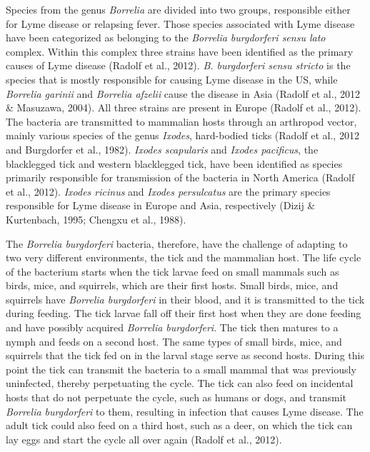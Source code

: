 \documentclass[12pt,twoside]{reedthesis}
\begin{document}
	
	 Species from the genus \textit{Borrelia} are divided into two groups, responsible either for Lyme disease or relapsing fever. Those species associated with Lyme disease have been categorized as belonging to the \textit{Borrelia burgdorferi sensu lato} complex. Within this complex three strains have been identified as the primary causes of Lyme disease (Radolf et al., 2012). \textit{B. burgdorferi sensu stricto} is the species that is mostly responsible for causing Lyme disease in the US, while \textit{Borrelia garinii} and \textit{Borrelia afzelii} cause the disease in Asia (Radolf et al., 2012 \& Masuzawa, 2004). All three strains are present in Europe (Radolf et al., 2012). The bacteria are transmitted to mammalian hosts through an arthropod vector, mainly various species of the genus \textit{Ixodes}, hard-bodied ticks (Radolf et al., 2012 and Burgdorfer et al., 1982). \textit{Ixodes scapularis} and \textit{Ixodes pacificus}, the blacklegged tick and western blacklegged tick, have been identified as species primarily responsible for transmission of the bacteria in North America (Radolf et al., 2012). \textit{Ixodes ricinus} and \textit{Ixodes persulcatus} are the primary species responsible for Lyme disease in Europe and Asia, respectively (Dizij \& Kurtenbach, 1995; Chengxu et al., 1988). 
	
	
	The \textit{Borrelia burgdorferi} bacteria, therefore, have the challenge of adapting to two very different environments, the tick and the mammalian host. The life cycle of the bacterium starts when the tick larvae feed on small mammals such as birds, mice, and squirrels, which are their first hosts. Small birds, mice, and squirrels have \textit{Borrelia burgdorferi} in their blood, and it is transmitted to the tick during feeding. The tick larvae fall off their first host when they are done feeding and have possibly acquired \textit{Borrelia burgdorferi}. The tick then matures to a nymph and feeds on a second host. The same types of small birds, mice, and squirrels that the tick fed on in the larval stage serve as second hosts. During this point the tick can transmit the bacteria to a small mammal that was previously uninfected, thereby perpetuating the cycle. The tick can also feed on incidental hosts that do not perpetuate the cycle, such as humans or dogs, and transmit \textit{Borrelia burgdorferi} to them, resulting in infection that causes Lyme disease. The adult tick could also feed on a third host, such as a deer, on which the tick can lay eggs and start the cycle all over again (Radolf et al., 2012). 
	
\end{document}
